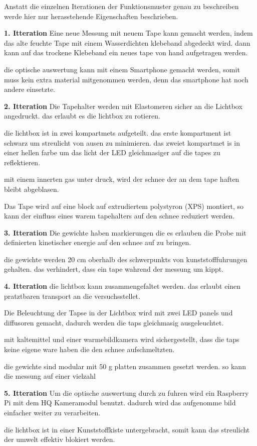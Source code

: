 Anstatt die einzelnen Iterationen der Funktionsmuster genau zu beschreiben werde hier nur herasstehende Eigenschaften beschrieben.


\textbf{1. Itteration}
Eine neue Messung mit neuem Tape kann gemacht werden, indem das alte feuchte Tape mit einem Wasserdichten klebeband abgedeckt wird. dann kann auf das trockene Klebeband ein neues tape von hand aufgetragen werden.

die optische auswertung kann mit einem Smartphone gemacht werden, somit muss kein extra material mitgenommen werden, denn das smartphone hat noch andere einsetzte.

\textbf{2. Itteration}
Die Tapehalter werden mit Elastomeren sicher an die Lichtbox angedruckt. das erlaubt es die lichtbox zu rotieren.

die lichtbox ist in zwei kompartmets aufgeteilt. das erste kompartment ist schwarz um streulicht von ausen zu minimieren. das zweiet kompartmet is in einer hellen farbe um das licht der LED gleichmasiger auf die tapes zu reflektieren.

mit einem innerten gas unter druck, wird der schnee der an dem tape haften bleibt abgeblasen.

Das Tape wird auf eine block auf extrudiertem polystyron (XPS) montiert, so kann der einfluss eines warem tapehalters auf den schnee reduziert werden.

\textbf{3. Itteration}
Die gewichte haben markierungen die es erlauben die Probe mit definierten kinetischer energie auf den schnee auf zu bringen.

die gewichte werden 20 cm oberhalb des schwerpunkts von kunststofffuhrungen gehalten. das verhindert, dass ein tape wahrend der messung um kippt.

\textbf{4. Itteration}
die lichtbox kann zusammengefaltet werden. das erlaubt einen pratztbaren transport an die versuchsstellet.

Die Beleuchtung der Tapse in der Lichtbox wird mit zwei LED panels und diffusoren gemacht, dadurch werden die taps gleichmasig ausgeleuchtet.

mit kaltemittel und einer warmebildkamera wird sichergestellt, dass die taps keine eigene ware haben die den schnee aufschmeltzten.

die gewichte sind modular mit 50 g platten zusammen gesetzt werden. so kann die messung auf einer vielzahl

\textbf{5. Itteration}
Um die optische auswertung durch zu fuhren wird ein Raspberry Pi mit dem HQ Kameramodul  benutzt. dadurch wird das aufgenomme bild einfacher weiter zu verarbeiten.

die lichtbox ist in einer Kunststoffkiste untergebracht, somit kann das streulicht der umwelt effektiv blokiert werden.
